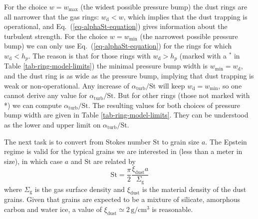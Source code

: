 \documentclass{aa}
\begin{document}
For the choice $w=w_{\mathrm{max}}$ (the widest possible pressure bump) the dust
rings are all narrower that the gas rings: $w_{\mathrm{d}}<w$, which implies
that the dust trapping is operational, and Eq.~(\ref{eq-alphaSt-equation}) gives
information about the turbulent strength. For the choice $w=w_{\mathrm{min}}$
(the narrowest possible pressure bump) we can only use
Eq.~(\ref{eq-alphaSt-equation}) for the rings for which
$w_{\mathrm{d}}<h_p$. The reason is that for those rings with
$w_{\mathrm{d}}>h_p$ (marked with a $^{*}$ in Table \ref{tab-ring-model-limits})
the minimal pressure bump width is $w_{\mathrm{min}}=w_{\mathrm{d}}$, and the
dust ring is as wide as the pressure bump, implying that dust trapping is weak
or non-operational. Any increase of $\alpha_{\mathrm{turb}}/\mathrm{St}$ will
keep $w_{\mathrm{d}}=w_{\mathrm{min}}$, so one cannot derive any value for
$\alpha_{\mathrm{turb}}/\mathrm{St}$. But for other rings (those not marked
with *) we can compute
$\alpha_{\mathrm{turb}}/\mathrm{St}$. The resulting values for both choices of
pressure bump width are given in Table \ref{tab-ring-model-limits}. They can be
understood as the lower and upper limit on $\alpha_{\mathrm{turb}}/\mathrm{St}$.


The next task is to convert from Stokes number $\mathrm{St}$ to grain size
$a$. The Epstein regime is valid for the typical grains we are interested in
(less than a meter in size), in which case $a$ and $\mathrm{St}$ are related
by 
\begin{equation}
\mathrm{St} = \frac{\pi}{2}\frac{\xi_{\mathrm{dust}}a}{\Sigma_{\mathrm{g}}}
\end{equation}
where $\Sigma_{\mathrm{g}}$ is the gas surface density and $\xi_{\mathrm{dust}}$
is the material density of the dust grains. Given that grains are expected
to be a mixture of silicate, amorphous carbon and water ice, a value of
$\xi_{\mathrm{dust}}\simeq 2\,\mathrm{g}/\mathrm{cm}^3$ is reasonable.
\end{document}
